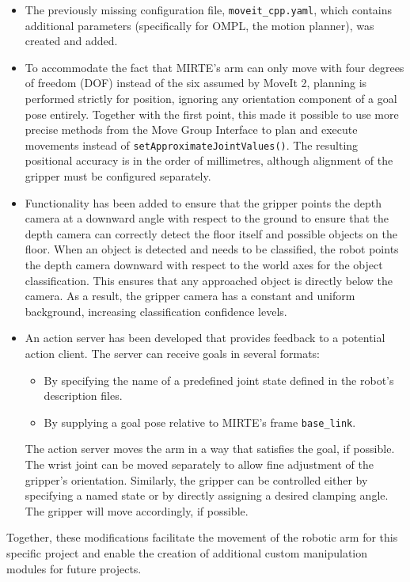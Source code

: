 \begin{itemize}
\item The previously missing configuration file, \texttt{moveit\_cpp.yaml}, which contains additional parameters (specifically for OMPL, the motion planner), was created and added.
\item To accommodate the fact that MIRTE's arm can only move with four degrees of freedom (DOF) instead of the six assumed by MoveIt 2, planning is performed strictly for position, ignoring any orientation component of a goal pose entirely. Together with the first point, this made it possible to use more precise methods from the Move Group Interface to plan and execute movements instead of \texttt{setApproximateJointValues()}. The resulting positional accuracy is in the order of millimetres, although alignment of the gripper must be configured separately.
\item Functionality has been added to ensure that the gripper points the depth camera at a downward angle with respect to the ground to ensure that the depth camera can correctly detect the floor itself and possible objects on the floor. When an object is detected and needs to be classified, the robot points the depth camera downward with respect to the world axes for the object classification. This ensures that any approached object is directly below the camera. As a result, the gripper camera has a constant and uniform background, increasing classification confidence levels.
\item An action server has been developed that provides feedback to a potential action client. The server can receive goals in several formats:

\begin{itemize}
\item By specifying the name of a predefined joint state defined in the robot's description files.
\item By supplying a goal pose relative to MIRTE's frame \texttt{base\_link}.
\end{itemize}

The action server moves the arm in a way that satisfies the goal, if possible. The wrist joint can be moved separately to allow fine adjustment of the gripper's orientation. Similarly, the gripper can be controlled either by specifying a named state or by directly assigning a desired clamping angle. The gripper will move accordingly, if possible.
\end{itemize}

Together, these modifications facilitate the movement of the robotic arm for this specific project and enable the creation of additional custom manipulation modules for future projects.